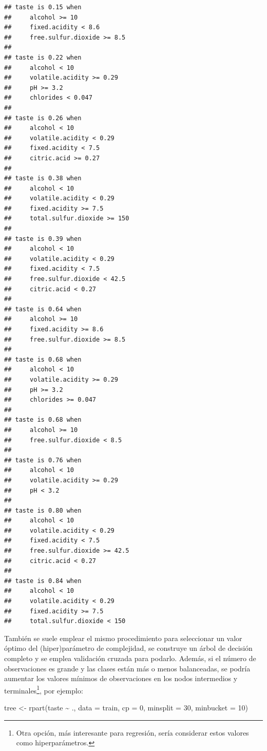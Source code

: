 \documentclass[
  spanish,
]{book}
\newenvironment{Shaded}{\begin{snugshade}}{\end{snugshade}}
\newcommand{\AttributeTok}[1]{\textcolor[rgb]{0.77,0.63,0.00}{#1}}
\newcommand{\DecValTok}[1]{\textcolor[rgb]{0.00,0.00,0.81}{#1}}
\newcommand{\FunctionTok}[1]{\textcolor[rgb]{0.00,0.00,0.00}{#1}}
\newcommand{\NormalTok}[1]{#1}
\newcommand{\OtherTok}[1]{\textcolor[rgb]{0.56,0.35,0.01}{#1}}
\newcommand{\SpecialCharTok}[1]{\textcolor[rgb]{0.00,0.00,0.00}{#1}}
\theoremstyle{break}
\theoremstyle{definition}
\theoremstyle{definition}
\theoremstyle{definition}
\theoremstyle{definition}
\theoremstyle{remark}
\begin{document}
\begin{verbatim}
## taste is 0.15 when
##     alcohol >= 10
##     fixed.acidity < 8.6
##     free.sulfur.dioxide >= 8.5
## 
## taste is 0.22 when
##     alcohol < 10
##     volatile.acidity >= 0.29
##     pH >= 3.2
##     chlorides < 0.047
## 
## taste is 0.26 when
##     alcohol < 10
##     volatile.acidity < 0.29
##     fixed.acidity < 7.5
##     citric.acid >= 0.27
## 
## taste is 0.38 when
##     alcohol < 10
##     volatile.acidity < 0.29
##     fixed.acidity >= 7.5
##     total.sulfur.dioxide >= 150
## 
## taste is 0.39 when
##     alcohol < 10
##     volatile.acidity < 0.29
##     fixed.acidity < 7.5
##     free.sulfur.dioxide < 42.5
##     citric.acid < 0.27
## 
## taste is 0.64 when
##     alcohol >= 10
##     fixed.acidity >= 8.6
##     free.sulfur.dioxide >= 8.5
## 
## taste is 0.68 when
##     alcohol < 10
##     volatile.acidity >= 0.29
##     pH >= 3.2
##     chlorides >= 0.047
## 
## taste is 0.68 when
##     alcohol >= 10
##     free.sulfur.dioxide < 8.5
## 
## taste is 0.76 when
##     alcohol < 10
##     volatile.acidity >= 0.29
##     pH < 3.2
## 
## taste is 0.80 when
##     alcohol < 10
##     volatile.acidity < 0.29
##     fixed.acidity < 7.5
##     free.sulfur.dioxide >= 42.5
##     citric.acid < 0.27
## 
## taste is 0.84 when
##     alcohol < 10
##     volatile.acidity < 0.29
##     fixed.acidity >= 7.5
##     total.sulfur.dioxide < 150
\end{verbatim}

También se suele emplear el mismo procedimiento para seleccionar un valor óptimo del (hiper)parámetro de complejidad, se construye un árbol de decisión completo y se emplea validación cruzada para podarlo.
Además, si el número de observaciones es grande y las clases están más o menos balanceadas,
se podría aumentar los valores mínimos de observaciones en los nodos intermedios y terminales\footnote{Otra opción, más interesante para regresión, sería considerar estos valores como hiperparámetros.}, por ejemplo:

\begin{Shaded}
\begin{Highlighting}[]
\NormalTok{tree }\OtherTok{\textless{}{-}} \FunctionTok{rpart}\NormalTok{(taste }\SpecialCharTok{\textasciitilde{}}\NormalTok{ ., }\AttributeTok{data =}\NormalTok{ train, }\AttributeTok{cp =} \DecValTok{0}\NormalTok{, }\AttributeTok{minsplit =} \DecValTok{30}\NormalTok{, }\AttributeTok{minbucket =} \DecValTok{10}\NormalTok{)}
\end{Highlighting}
\end{Shaded}
\end{document}
